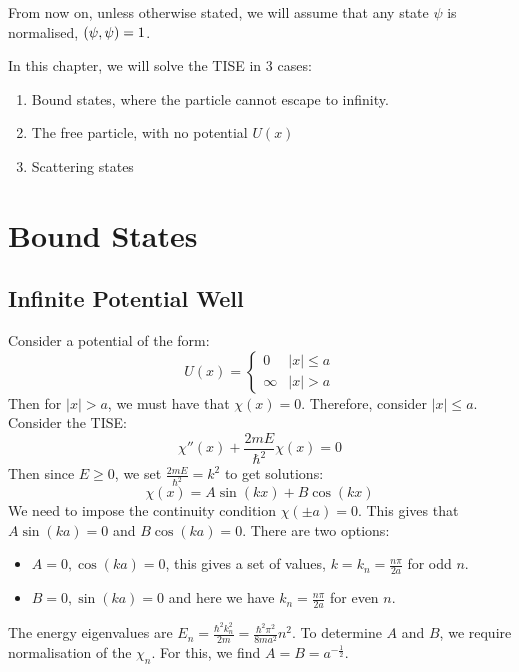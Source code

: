 \documentclass[../Main.tex]{subfiles}
\begin{document}
\begin{remark}
    From now on, unless otherwise stated, we will assume that any state $\psi$ is normalised, $\left(\psi,\psi\right) = 1$.
\end{remark}
In this chapter, we will solve the TISE in 3 cases:
\begin{enumerate}
    \item Bound states, where the particle cannot escape to infinity.
    \item The free particle, with no potential $U(x)$
    \item Scattering states
\end{enumerate}
\section{Bound States}
\subsection{Infinite Potential Well}
Consider a potential of the form:
\begin{equation*}
    U(x) =
    \begin{cases}
        0 & |x| \leq a \\
        \infty & |x| > a
    \end{cases}
\end{equation*}
Then for $|x| > a$, we must have that $\chi(x) = 0$. Therefore, consider $|x| \leq a$. Consider the TISE:
\begin{equation*}
    \chi''(x) + \frac{2mE}{\hbar^2} \chi(x) = 0
\end{equation*}
Then since $E \geq 0$, we set $\frac{2mE}{\hbar^2} = k^2$ to get solutions:
\begin{equation*}
    \chi(x) = A\sin(kx) + B\cos(kx)
\end{equation*}
We need to impose the continuity condition $\chi(\pm a) = 0$. This gives that $A\sin(ka) = 0$ and $B\cos(ka) = 0$. There are two options:
\begin{itemize}
    \item $A = 0, \cos(ka) = 0$, this gives a set of values, $k = k_n = \frac{n\pi}{2a}$ for odd $n$.
    \item $B = 0, \sin(ka) = 0$ and here we have $k_n = \frac{n\pi}{2a}$ for even $n$.
\end{itemize}
The energy eigenvalues are $E_n = \frac{\hbar^2 k_n^2}{2m} = \frac{\hbar^2 \pi^2}{8ma^2}n^2$. To determine $A$ and $B$, we require normalisation of the $\chi_n$. For this, we find $A = B = a^{-\frac12}$.
\end{document}
